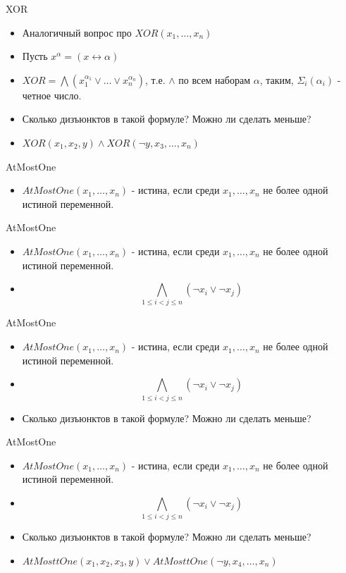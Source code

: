 \documentclass{beamer}
\begin{document}
\begin{frame}{XOR}
\begin{itemize}
\item Аналогичный вопрос про $XOR(x_1, \dots, x_n)$
\item Пусть $x^{\alpha} = (x \leftrightarrow \alpha)$
\item $XOR = \bigwedge(x_1^{\alpha_1} \vee \dots \vee x_n^{\alpha_n})$, т.е. $\wedge$ по всем наборам $\alpha$, таким,
$\Sigma_i(\alpha_i)$ - четное число.
\item Сколько дизъюнктов в такой формуле? Можно ли сделать меньше?
\item $XOR(x_1, x_2, y) \wedge XOR(\lnot y, x_3, \dots, x_n)$
\end{itemize}
\end{frame}

\begin{frame}{AtMostOne}
\begin{itemize}
\item $AtMostOne(x_1, \dots, x_n)$ - истина, если среди $x_1, \dots, x_n$ не более одной истиной переменной.
\end{itemize}
\end{frame}

\begin{frame}{AtMostOne}
\begin{itemize}
\item $AtMostOne(x_1, \dots, x_n)$ - истина, если среди $x_1, \dots, x_n$ не более одной истиной переменной.
\item \[\bigwedge_{1 \le i < j \le n}(\lnot x_i \vee \lnot x_j)\]
\end{itemize}
\end{frame}

\begin{frame}{AtMostOne}
\begin{itemize}
\item $AtMostOne(x_1, \dots, x_n)$ - истина, если среди $x_1, \dots, x_n$ не более одной истиной переменной.
\item \[\bigwedge_{1 \le i < j \le n}(\lnot x_i \vee \lnot x_j)\]
\item Сколько дизъюнктов в такой формуле? Можно ли сделать меньше?
\end{itemize}
\end{frame}

\begin{frame}{AtMostOne}
\begin{itemize}
\item $AtMostOne(x_1, \dots, x_n)$ - истина, если среди $x_1, \dots, x_n$ не более одной истиной переменной.
\item \[\bigwedge_{1 \le i < j \le n}(\lnot x_i \vee \lnot x_j)\]
\item Сколько дизъюнктов в такой формуле? Можно ли сделать меньше?
\item $AtMosttOne(x_1, x_2, x_3, y) \vee AtMosttOne(\lnot y, x_4, \dots, x_n)$
\end{itemize}
\end{frame}
\end{document}
